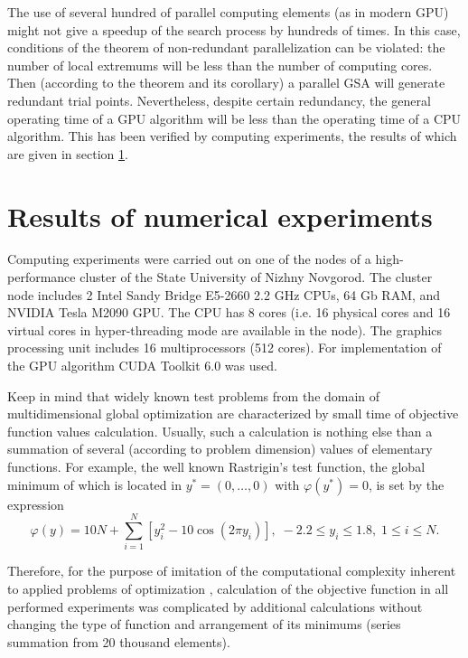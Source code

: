 \documentclass[smallcondensed]{svjour3}     %
\begin{document}
The use of several hundred of parallel computing elements (as in modern GPU) might not give a speedup of the search process by hundreds of times. In this case, conditions of the theorem of non-redundant parallelization can be violated: the number of local extremums will be less than the number of computing cores. Then (according to the theorem and its corollary) a parallel GSA will generate redundant trial points. Nevertheless, despite certain redundancy, the general operating time of a GPU algorithm will be less than the operating time of a CPU algorithm. This has been verified by computing experiments, the results of which are given in section \ref{sec:6}.

\section{Results of numerical experiments} \label{sec:6}

Computing experiments were carried out on one of the nodes of a high-performance cluster of the State University of Nizhny Novgorod. The cluster node includes 2 Intel Sandy Bridge E5-2660 2.2 GHz CPUs, 64 Gb RAM, and NVIDIA Tesla M2090 GPU. The CPU has 8 cores (i.e. 16 physical cores and 16 virtual cores in hyper-threading mode are available in the node). The graphics processing unit includes 16 multiprocessors (512 cores). For implementation of the GPU algorithm CUDA Toolkit 6.0 was used.

Keep in mind that widely known test problems from the domain of multidimensional global optimization are characterized by small time of objective function values calculation. Usually, such a calculation is nothing else than a summation of several (according to problem dimension) values of elementary functions. For example, the well known Rastrigin’s test function, the global minimum of which is located in $y^\ast = (0,\dots,0)$ with $\varphi(y^\ast)=0$, is set by the expression
\begin{equation}\label{eq:33}
\varphi(y)=10N+\sum^{N}_{i=1}\left[y^2_i-10\cos(2\pi y_i)\right], \; -2.2\leq y_i \leq 1.8, \; 1\leq i \leq N.
\end{equation}

Therefore, for the purpose of imitation of the computational complexity inherent to applied problems of optimization \cite{RefBarkalov2013}, calculation of the objective function in all performed experiments was complicated by additional calculations without changing the type of function and arrangement of its minimums (series summation from 20 thousand elements).
\end{document}
